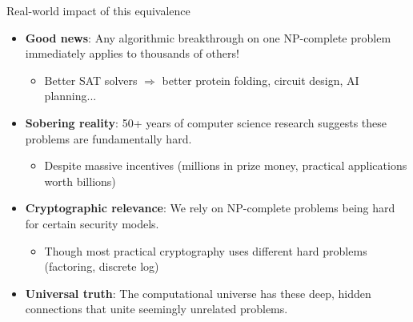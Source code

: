 \documentclass[aspectratio=169, lualatex, handout]{beamer}
\begin{document}
\begin{frame}{Real-world impact of this equivalence}
	\begin{itemize}[<+->]
		\item \textbf{Good news}: Any algorithmic breakthrough on one NP-complete problem immediately applies to thousands of others!
		      \begin{itemize}
			      \item Better SAT solvers $\Rightarrow$ better protein folding, circuit design, AI planning...
		      \end{itemize}
		\item \textbf{Sobering reality}: 50+ years of computer science research suggests these problems are fundamentally hard.
		      \begin{itemize}
			      \item Despite massive incentives (millions in prize money, practical applications worth billions)
		      \end{itemize}
		\item \textbf{Cryptographic relevance}: We rely on NP-complete problems being hard for certain security models.
		      \begin{itemize}
			      \item Though most practical cryptography uses different hard problems (factoring, discrete log)
		      \end{itemize}
		\item \textbf{Universal truth}: The computational universe has these deep, hidden connections that unite seemingly unrelated problems.
	\end{itemize}
\end{frame}
\end{document}
